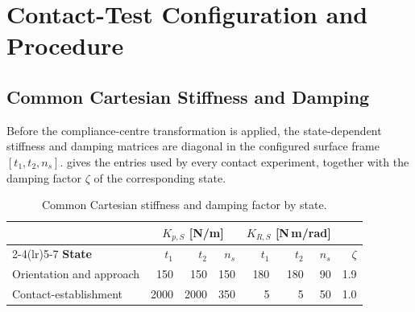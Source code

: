 \section{Contact-Test Configuration and Procedure}
\label{sec:experimental_controller_parameters}
\label{sec:cartesian_stiffness_selection}



\subsection{Common Cartesian Stiffness and Damping}
\label{subsec:initial_stiffness_damping_values}
\label{subsec:experimental_inertia_scaled_damping}

Before the compliance-centre transformation is applied, the state-dependent
stiffness and damping matrices are diagonal in the configured surface frame
\([t_1,t_2,n_s]\).  gives the entries used
by every contact experiment, together with the damping factor \(\zeta\) of
the corresponding state.

\begin{table}[H]
\centering
\small
\caption{Common Cartesian stiffness and damping factor by state.}
\label{tab:experimental_common_gains}
\begin{tabular}{@{}lrrrrrrr@{}}
\toprule
& \multicolumn{3}{c}{\(K_{p,S}\) [N/m]} & \multicolumn{3}{c}{\(K_{R,S}\) [N\,m/rad]} & \\
\cmidrule(lr){2-4}\cmidrule(lr){5-7}
\textbf{State} & \(t_1\) & \(t_2\) & \(n_s\) & \(t_1\) & \(t_2\) & \(n_s\) & \(\zeta\)\\
\midrule
Orientation and approach & 150 & 150 & 150 & 180 & 180 & 90 & 1.9\\
Contact-establishment & 2000 & 2000 & 350 & 5 & 5 & 50 & 1.0\\
\bottomrule
\end{tabular}
\end{table}



